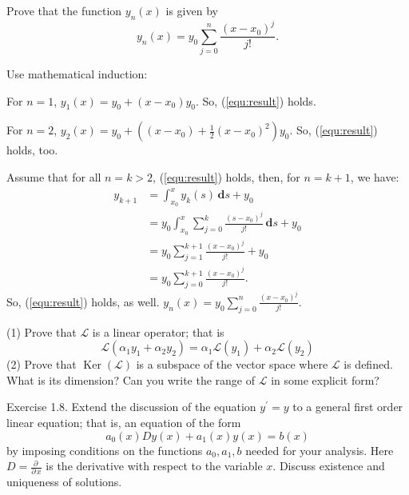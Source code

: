 \documentclass[en, normal, 12pt, black]{elegantnote}
\newenvironment{exercise}[1]{\begin{tcolorbox}[colback=black!15, colframe=black!80, title=#1]}{\end{tcolorbox}}
\renewenvironment{proof}{\begin{tcolorbox}[colback=white, colframe=black!50, title=Proof. ]\setlength{\parskip}{0.8em}}{\end{tcolorbox}}
\newcommand{\pder}{\partial\,}
\newcommand{\der}{\,\mathbf{d}}
\begin{document}
    \begin{exercise}{1.6.}
        Prove that the function $y_n(x)$ is given by
        \begin{equation}
            \label{equ:result}
            y_{n}(x)=y_{0} \sum_{j=0}^{n} \frac{\left(x-x_{0}\right)^{j}}{j !}.
        \end{equation}
    \end{exercise}
    \begin{proof}
        Use mathematical induction: 

        For \(n=1\), \(y_1(x)=y_0+(x-x_0)y_0\). So, (\ref{equ:result}) holds. 

        For \(n=2\), \(y_2(x)=y_0+\left((x-x_0)+\frac{1}{2}(x-x_0)^2\right)y_0\). So, (\ref{equ:result}) holds, too. 

        Assume that for all \(n=k>2\), (\ref{equ:result}) holds, then, for \(n=k+1\), we have: 
        \begin{align*}
            y_{k+1}&=\int_{x_0}^xy_k(s)\der s + y_0\\
            &=y_0\int_{x_0}^x\sum_{j=0}^{k} \frac{\left(s-x_{0}\right)^{j}}{j !}\der s + y_0\\
            &=y_0\sum_{j=1}^{k+1} \frac{\left(x-x_{0}\right)^{j}}{j !}+y_0\\
            &=y_0\sum_{j=0}^{k+1} \frac{\left(x-x_{0}\right)^{j}}{j !}. 
        \end{align*}
        So, (\ref{equ:result}) holds, as well. \( y_{n}(x)=y_{0} \sum_{j=0}^{n} \frac{\left(x-x_{0}\right)^{j}}{j !}\). 

    \end{proof}

    \begin{exercise}{1.7.}
            (1) Prove that \(\mathcal{L}\) is a linear operator; that is 
            \[\mathcal{L}\left(\alpha_{1} y_{1}+\alpha_{2} y_{2}\right)=\alpha_{1} \mathcal{L}\left(y_{1}\right)+\alpha_{2} \mathcal{L}\left(y_{2}\right)\]
            (2) Prove that $\operatorname{Ker}(\mathcal{L})$ is a subspace of the vector space where $\mathcal{L}$ is defined. What is its dimension? Can you write the range of $\mathcal{L}$ in some explicit form? 
    \end{exercise}

    \begin{exercise}{1.18.}
        Exercise 1.8. Extend the discussion of the equation $y^{\prime}=y$ to a general first order linear equation; that is, an equation of the form
        \[
            a_{0}(x) D y(x)+a_{1}(x) y(x)=b(x)
        \]
        by imposing conditions on the functions \(a_{0}, a_{1}, b\) needed for your analysis. Here \(D=\frac{\pder}{\pder x}\) is the derivative with respect to the variable \(x\). Discuss existence and uniqueness of solutions.
    \end{exercise}
\end{document}
